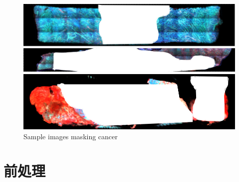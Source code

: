 \begin{figure}[H]
	\centering

	\begin{minipage}{0.8\columnwidth}
		\centering
		\includegraphics[clip, width=\linewidth]{fig/raw_data/label/C-013}
	\end{minipage}	

	\begin{minipage}{0.8\columnwidth}
		\centering
		\includegraphics[clip, width=\linewidth]{fig/raw_data/label/C-012}
	\end{minipage}

	\begin{minipage}{0.8\columnwidth}
		\centering
	\end{minipage}

	\begin{minipage}{0.8\columnwidth}
		\centering
		\includegraphics[clip, width=\linewidth]{fig/raw_data/label/C-011}
	\end{minipage}
	
	\caption{Sample images masking cancer}
	\label{fig:コラ画像}

\end{figure}


\section{前処理}

